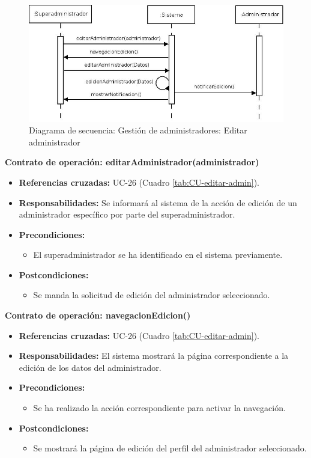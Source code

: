 \begin{figure}[H]
\centering
  \includegraphics[scale=.50]{img/secuencias/gestion-administradores-editar-administrador.jpeg}
  \caption{Diagrama de secuencia: Gestión de administradores: Editar administrador}
  \label{fig:secuencia-gestion-administradores-editar-administrador}
\end{figure}

\textbf{Contrato de operación: editarAdministrador(administrador)}
\begin{itemize}
\item \textbf{Referencias cruzadas:} UC-26 (Cuadro \ref{tab:CU-editar-admin}).
\item \textbf{Responsabilidades:} Se informará al sistema de la acción de edición de un administrador específico por parte del superadministrador.
\item \textbf{Precondiciones:} 
 \begin{itemize}
\item El superadministrador se ha identificado en el sistema previamente.
\end {itemize}
\item \textbf{Postcondiciones:} 
 \begin{itemize}
\item Se manda la solicitud de edición del administrador seleccionado.
\end {itemize}
\end {itemize}

\textbf{Contrato de operación: navegacionEdicion()}
\begin{itemize}
\item \textbf{Referencias cruzadas:} UC-26 (Cuadro \ref{tab:CU-editar-admin}).
\item \textbf{Responsabilidades:} El sistema mostrará la página correspondiente a la edición de los datos del administrador.
\item \textbf{Precondiciones:} 
 \begin{itemize}
\item Se ha realizado la acción correspondiente para activar la navegación.
\end {itemize}
\item \textbf{Postcondiciones:} 
 \begin{itemize}
\item Se mostrará la página de edición del perfil del administrador seleccionado.
\end {itemize}
\end {itemize}

